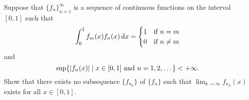 \documentclass{article}
\begin{document}
	\setlength{\parindent}{0pt}
	Suppose that $\{f_n\}_{n=1}^\infty$ is a sequence of continuous functions on the interval $[0,1]$ such that
	$$\int_{0}^{1} f_m(x)f_n(x)\,\textup{d}x=\begin{cases}
		1&\textup{if }n=m\\
		0&\textup{if }n\neq m
	\end{cases}$$
	and
	$$\sup\{\lvert f_n(x)\rvert\;\vert\; x\in[0,1]\textup{ and }n=1,2,\dots\}<+\infty.$$
	Show that there exists no subsequence $\{f_{n_k}\}$ of $\{f_n\}$ such that $\lim_{k\to\infty} f_{n_k}(x)$ exists for all $x\in[0,1]$.
\end{document}
